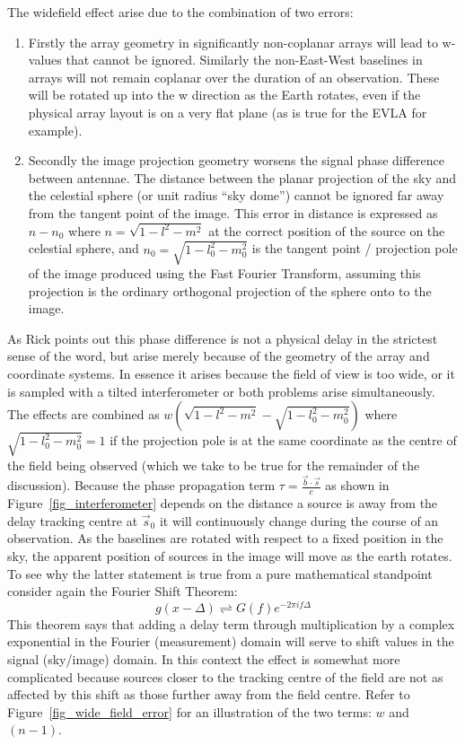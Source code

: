 The widefield effect arise due to the combination of two errors:
\begin{enumerate}
 \item Firstly the array geometry in significantly non-coplanar arrays will lead to w-values that cannot be ignored. Similarly the non-East-West baselines
 in arrays will not remain coplanar over the duration of an observation. These will be rotated up into the w direction as the Earth rotates, even if the physical 
 array layout is on a very flat plane (as is true for the EVLA for example).
 \item Secondly the image projection geometry worsens the signal phase difference between antennae. The distance between the planar projection of the sky and the 
 celestial sphere (or unit radius ``sky dome'') cannot be ignored far away from the tangent point of the image. This error in distance is expressed 
 as $n-n_0$ where $n = \sqrt{1-l^2-m^2}$ at the correct position of the source on the celestial sphere, and $n_0=\sqrt{1-l_0^2-m_0^2}$ is the 
 tangent point / projection pole of the image produced using the Fast Fourier Transform, assuming this projection is the ordinary orthogonal 
 projection of the sphere onto to the image.
\end{enumerate}
As Rick points out this phase difference is not a physical delay in the strictest sense of the word, but arise merely because of the geometry of the array and coordinate
systems. In essence it arises because the field of view is too wide, or it is sampled with a tilted interferometer or both problems arise simultaneously. The effects 
are combined as $w(\sqrt{1-l^2-m^2} - \sqrt{1-l_0^2-m_0^2})$ where $\sqrt{1-l_0^2-m_0^2} = 1$ if the projection pole is at the same coordinate as the centre
of the field being observed (which we take to be true for the remainder of the discussion). Because the phase propagation term $\tau = \frac{\vec{b}\cdot\vec{s}}{c}$ as 
shown in Figure~\ref{fig_interferometer} depends on the distance a source is away from the delay tracking centre at $\vec{s}_0$ it will continuously change during the course 
of an observation. As the baselines are rotated with respect to a fixed position in the sky, the apparent position of sources in the image will move as the earth rotates. To see why 
the latter statement is true from a pure mathematical standpoint consider again the Fourier Shift Theorem:
\begin{equation}
 g(x-\Delta) \rightleftharpoons G(f)e^{-2\pi if\Delta}
\end{equation}
This theorem says that adding a delay term through multiplication by a complex exponential in the Fourier (measurement) domain will serve to shift values in the 
signal (sky/image) domain. In this context the effect is somewhat more complicated because sources closer to the tracking centre of the field are not as affected 
by this shift as those further away from the field centre. Refer to Figure~\ref{fig_wide_field_error} for an illustration of the two terms: $w$ and $(n-1)$.


